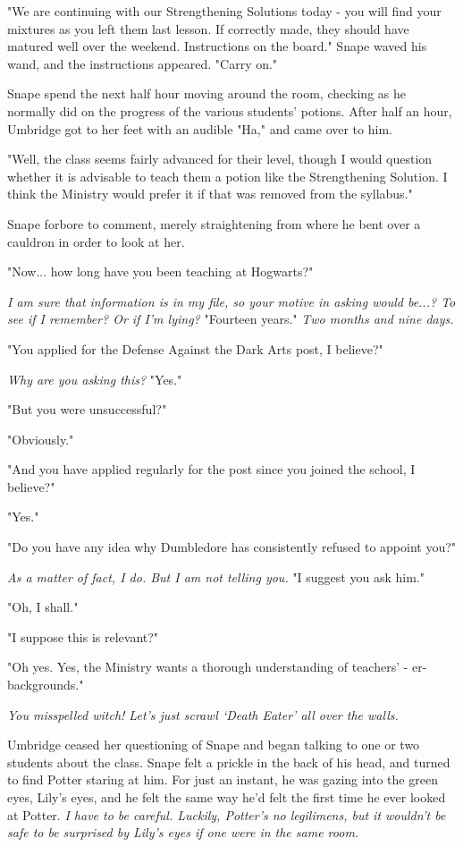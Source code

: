 \documentclass[a4paper,11pt]{article}
\begin{document}
"We are continuing with our Strengthening Solutions today - you will find your mixtures as you left them last lesson. If correctly made, they should have matured well over the weekend. Instructions on the board." Snape waved his wand, and the instructions appeared. "Carry on."

Snape spend the next half hour moving around the room, checking as he normally did on the progress of the various students' potions. After half an hour, Umbridge got to her feet with an audible "Ha," and came over to him.

"Well, the class seems fairly advanced for their level, though I would question whether it is advisable to teach them a potion like the Strengthening Solution. I think the Ministry would prefer it if that was removed from the syllabus."

Snape forbore to comment, merely straightening from where he bent over a cauldron in order to look at her.

"Now... how long have you been teaching at Hogwarts?"

\emph{I am sure that information is in my file, so your motive in asking would be...? To see if I remember? Or if I'm lying?} "Fourteen years." \emph{Two months and nine days.}

"You applied for the Defense Against the Dark Arts post, I believe?"

\emph{Why are you asking this?} "Yes."

"But you were unsuccessful?"

"Obviously."

"And you have applied regularly for the post since you joined the school, I believe?"

"Yes."

"Do you have any idea why Dumbledore has consistently refused to appoint you?"

\emph{As a matter of fact, I do. But I am not telling you.} "I suggest you ask him."

"Oh, I shall."

"I suppose this is relevant?"

"Oh yes. Yes, the Ministry wants a thorough understanding of teachers' - er- backgrounds."

\emph{You misspelled witch! Let's just scrawl `Death Eater' all over the walls.}

Umbridge ceased her questioning of Snape and began talking to one or two students about the class. Snape felt a prickle in the back of his head, and turned to find Potter staring at him. For just an instant, he was gazing into the green eyes, Lily's eyes, and he felt the same way he'd felt the first time he ever looked at Potter. \emph{I have to be careful. Luckily, Potter's no legilimens, but it wouldn't be safe to be surprised by Lily's eyes if one were in the same room.}
\end{document}
